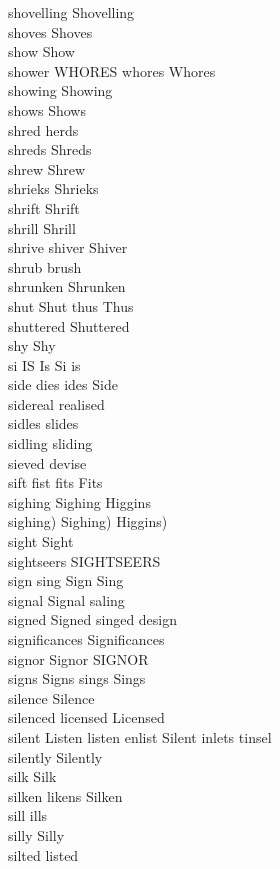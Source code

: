 shovelling Shovelling\\
shoves Shoves\\
show Show\\
shower WHORES whores Whores\\
showing Showing\\
shows Shows\\
shred herds\\
shreds Shreds\\
shrew Shrew\\
shrieks Shrieks\\
shrift Shrift\\
shrill Shrill\\
shrive shiver Shiver\\
shrub brush\\
shrunken Shrunken\\
shut Shut thus Thus\\
shuttered Shuttered\\
shy Shy\\
si IS Is Si is\\
side dies ides Side\\
sidereal realised\\
sidles slides\\
sidling sliding\\
sieved devise\\
sift fist fits Fits\\
sighing Sighing Higgins\\
sighing) Sighing) Higgins)\\
sight Sight\\
sightseers SIGHTSEERS\\
sign sing Sign Sing\\
signal Signal saling\\
signed Signed singed design\\
significances Significances\\
signor Signor SIGNOR\\
signs Signs sings Sings\\
silence Silence\\
silenced licensed Licensed\\
silent Listen listen enlist Silent inlets tinsel\\
silently Silently\\
silk Silk\\
silken likens Silken\\
sill ills\\
silly Silly\\
silted listed\\
